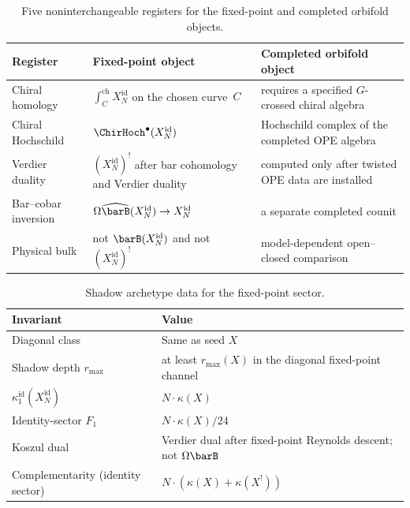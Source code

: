 \begin{table}[ht]
\centering
\small
\caption{Five noninterchangeable registers for the fixed-point and
completed orbifold objects.}\label{tab:symn-register-firewall}
\begin{tabular}{p{3.0cm}p{5.0cm}p{5.0cm}}
\toprule
\textbf{Register} & \textbf{Fixed-point object}
 & \textbf{Completed orbifold object} \\
\midrule
Chiral homology &
 $\int_C^{\mathrm{ch}} X_N^{\mathrm{id}}$ on the chosen curve~$C$ &
 requires a specified $G$-crossed chiral algebra \\
Chiral Hochschild &
 $\ChirHoch^\bullet(X_N^{\mathrm{id}})$ &
 Hochschild complex of the completed OPE algebra \\
Verdier duality &
 $(X_N^{\mathrm{id}})^!$ after bar cohomology and Verdier duality &
 computed only after twisted OPE data are installed \\
Bar--cobar inversion &
 $\Omega\widehat{\barB}(X_N^{\mathrm{id}})\to X_N^{\mathrm{id}}$ &
 a separate completed counit \\
Physical bulk &
 not $\barB(X_N^{\mathrm{id}})$ and not $(X_N^{\mathrm{id}})^!$ &
 model-dependent open--closed comparison \\
\bottomrule
\end{tabular}
\end{table}

\begin{table}[ht]
\centering
\small
\caption{Shadow archetype data for the fixed-point
sector.}\label{tab:symn-shadow-archetype}
\begin{tabular}{ll}
\toprule
\textbf{Invariant} & \textbf{Value} \\
\midrule
Diagonal class & Same as seed $X$ \\
Shadow depth $r_{\max}$ &
 at least $r_{\max}(X)$ in the diagonal fixed-point channel \\
$\kappa^{\mathrm{id}}_1(X_N^{\mathrm{id}})$ &
 $N \cdot \kappa(X)$ \\
Identity-sector $F_1$ & $N \cdot \kappa(X) / 24$ \\
Koszul dual &
 Verdier dual after fixed-point Reynolds descent; not
 $\Omega\barB$ \\
Complementarity (identity sector) &
 $N \cdot (\kappa(X) + \kappa(X^!))$ \\
\bottomrule
\end{tabular}
\end{table}

